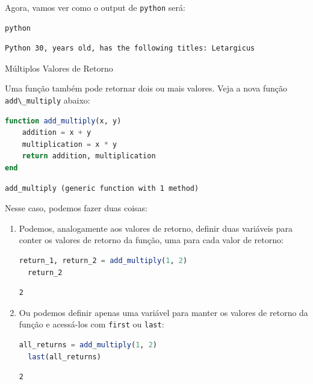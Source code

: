 \documentclass[
  notoc %
]{tufte-book}
\makeatletter
\newcommand{\passthrough}[1]{#1}
\renewcommand\subsubsection{%
\@startsection{subsubsection}{3}{\z@ }{-3.25ex\@plus -1ex \@minus -.2ex}{1.5ex \@plus .2ex}{\normalfont \normalsize \bfseries }
}
\makeatother
\begin{document}
Agora, vamos ver como o output de \passthrough{\lstinline!python!} será:

\begin{lstlisting}[language=Julia]
python
\end{lstlisting}

\begin{lstlisting}[language=Output]
Python 30, years old, has the following titles: Letargicus
\end{lstlisting}

\hypertarget{sec:function_multiple}{%
\subsubsection{Múltiplos Valores de
Retorno}\label{sec:function_multiple}}

Uma função também pode retornar dois ou mais valores. Veja a nova função
\passthrough{\lstinline!add\_multiply!} abaixo:

\begin{lstlisting}[language=Julia]
function add_multiply(x, y)
    addition = x + y
    multiplication = x * y
    return addition, multiplication
end
\end{lstlisting}

\begin{lstlisting}[language=Output]
add_multiply (generic function with 1 method)
\end{lstlisting}

Nesse caso, podemos fazer duas coisas:

\begin{enumerate}
\def\labelenumi{\arabic{enumi}.}
\item
  Podemos, analogamente aos valores de retorno, definir duas variáveis
  para conter os valores de retorno da função, uma para cada valor de
  retorno:

  \begin{lstlisting}[language=Julia]
  return_1, return_2 = add_multiply(1, 2)
  return_2
  \end{lstlisting}

  \begin{lstlisting}[language=Output]
  2
  \end{lstlisting}
\item
  Ou podemos definir apenas uma variável para manter os valores de
  retorno da função e acessá-los com \passthrough{\lstinline!first!} ou
  \passthrough{\lstinline!last!}:

  \begin{lstlisting}[language=Julia]
  all_returns = add_multiply(1, 2)
  last(all_returns)
  \end{lstlisting}

  \begin{lstlisting}[language=Output]
  2
  \end{lstlisting}
\end{enumerate}
\end{document}
